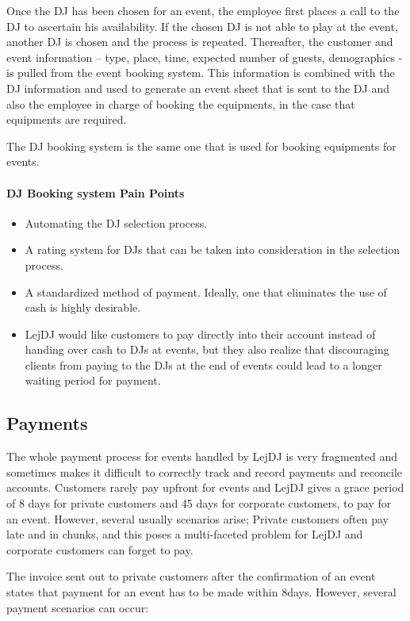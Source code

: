 \documentclass[envcountsame]{llncs}
\begin{document}
Once the DJ has been chosen for an event, the employee first places a
call to the DJ to ascertain his availability. If the chosen DJ is not
able to play at the event, another DJ is chosen and the process is
repeated. Thereafter, the customer and event information – type,
place, time, expected number of guests, demographics - is pulled from
the event booking system. This information is combined with the DJ
information and used to generate an event sheet that is sent to the DJ
and also the employee in charge of booking the equipments, in the case
that equipments are required.

The DJ booking system is the same one that is used for booking
equipments for events.

\paragraph{DJ Booking system Pain Points}

\begin{itemize}
\item Automating the DJ selection process.
\item A rating system for DJs that can be taken into consideration in
  the selection process.
\item A standardized method of payment. Ideally, one that eliminates
  the use of cash is highly desirable.
\item LejDJ would like customers to pay directly into their account
  instead of handing over cash to DJs at events, but they also realize
  that discouraging clients from paying to the DJs at the end of
  events could lead to a longer waiting period for payment.
\end{itemize}

\subsection{Payments}

The whole payment process for events handled by LejDJ is very
fragmented and sometimes makes it difficult to correctly track and
record payments and reconcile accounts.   Customers rarely pay upfront
for events and LejDJ gives a grace period of 8 days for private
customers and 45 days for corporate customers, to pay for an event.
However, several usually scenarios arise; Private customers often pay
late and in chunks, and this poses a multi-faceted problem for LejDJ
and corporate customers can forget to pay.

The invoice sent out to private customers after the confirmation of an
event states that payment for an event has to be made within 8days.
However, several payment scenarios can occur:
\end{document}

